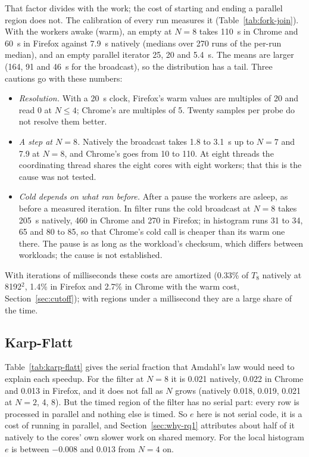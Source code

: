 That factor divides with the work; the cost of starting and ending
a parallel region does not. The calibration of every run measures it
(Table~\ref{tab:fork-join}). With the workers awake (warm), an empty
 at $N=8$ takes 110~\textmu s in Chrome and 60~\textmu s in
Firefox against 7.9~\textmu s natively (medians over 270 runs of the
per-run median), and an empty parallel iterator 25, 20 and 5.4~\textmu s.
The means are larger (164, 91 and 46~\textmu s for the broadcast), so the
distribution has a tail. Three cautions go with these numbers:
\begin{itemize}[leftmargin=1.5em]
\item \emph{Resolution.} With a 20~\textmu s clock, Firefox's warm values
are multiples of 20 and read 0 at $N \leq 4$; Chrome's are multiples of 5.
Twenty samples per probe do not resolve them better.
\item \emph{A step at $N=8$.} Natively the broadcast takes 1.8 to
3.1~\textmu s up to $N=7$ and 7.9 at $N=8$, and Chrome's goes from 10 to
110. At eight threads the coordinating thread shares the eight cores with
eight workers; that this is the cause was not tested.
\item \emph{Cold depends on what ran before.} After a pause the workers are
asleep, as before a measured iteration. In filter runs the cold broadcast
at $N=8$ takes 205~\textmu s natively, 460 in Chrome and 270 in Firefox; in
histogram runs 31 to 34, 65 and 80 to 85, so that Chrome's cold call is
cheaper than its warm one there. The pause is as long as the workload's
checksum, which differs between workloads; the cause is not established.
\end{itemize}
With iterations of milliseconds these costs are amortized (0.33\% of $T_8$
natively at 8192$^2$, 1.4\% in Firefox and 2.7\% in Chrome with the warm
cost, Section~\ref{sec:cutoff}); with regions under a millisecond they are a
large share of the time.

\subsection{Karp-Flatt}

Table~\ref{tab:karp-flatt} gives the serial fraction that Amdahl's law
would need to explain each speedup. For the filter at $N=8$ it is 0.021
natively, 0.022 in Chrome and 0.013 in Firefox, and it does not fall as $N$
grows (natively 0.018, 0.019, 0.021 at $N=2$, 4, 8). But the timed region
of the filter has no serial part: every row is processed in parallel and
nothing else is timed. So $e$ here is not serial code, it is a cost of
running in parallel, and Section~\ref{sec:why-rq1} attributes about half of
it natively to the cores' own slower work on shared memory. For the local
histogram $e$ is between $-0.008$ and $0.013$ from $N=4$ on.









